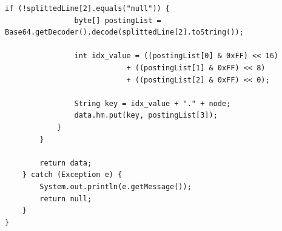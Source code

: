\begin{lstlisting}[style=JavaStyle]
            if (!splittedLine[2].equals("null")) {
                byte[] postingList = Base64.getDecoder().decode(splittedLine[2].toString());

                int idx_value = ((postingList[0] & 0xFF) << 16)
                            + ((postingList[1] & 0xFF) << 8)
                            + ((postingList[2] & 0xFF) << 0);

                String key = idx_value + "." + node;
                data.hm.put(key, postingList[3]);
            }
        }

        return data;
    } catch (Exception e) {
        System.out.println(e.getMessage());
        return null;
    }
}
\end{lstlisting}